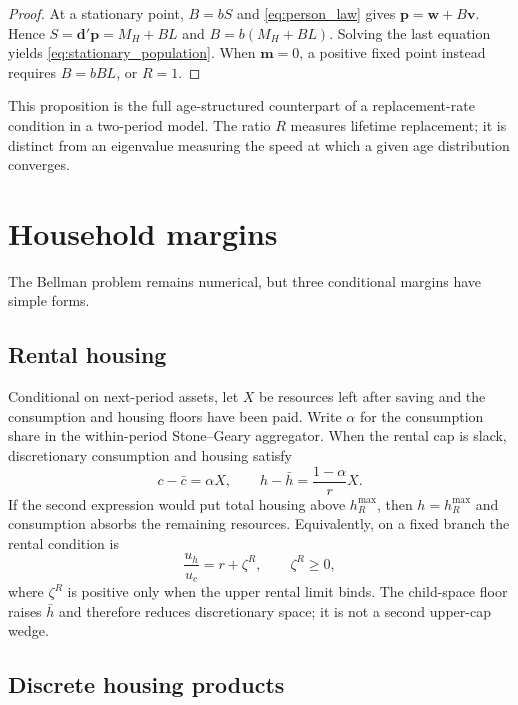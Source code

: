 \documentclass[11pt]{article}
\begin{document}
\begin{proof}
At a stationary point, $B=bS$ and \eqref{eq:person_law} gives
$\mathbf p=\mathbf w+B\mathbf v$.  Hence
$S=\mathbf d'\mathbf p=M_H+BL$ and
$B=b(M_H+BL)$.  Solving the last equation yields
\eqref{eq:stationary_population}.  When $\mathbf m=0$, a positive fixed point
instead requires $B=bBL$, or $R=1$.
\end{proof}

This proposition is the full age-structured counterpart of a replacement-rate
condition in a two-period model.  The ratio $R$ measures lifetime replacement;
it is distinct from an eigenvalue measuring the speed at which a given age
distribution converges.

\section{Household margins}

The Bellman problem remains numerical, but three conditional margins have
simple forms.

\subsection{Rental housing}

Conditional on next-period assets, let $X$ be resources left after saving and
the consumption and housing floors have been paid.  Write $\alpha$ for the
consumption share in the within-period Stone--Geary aggregator.  When the
rental cap is slack, discretionary consumption and housing satisfy
\begin{equation}
 c-\bar c=\alpha X,
 \qquad
 h-\bar h=\frac{1-\alpha}{r}X.
 \label{eq:renter_solution}
\end{equation}
If the second expression would put total housing above $h_R^{\max}$, then
$h=h_R^{\max}$ and consumption absorbs the remaining resources.  Equivalently,
on a fixed branch the rental condition is
\begin{equation}
 \frac{u_h}{u_c}=r+\zeta^R,
 \qquad
 \zeta^R\geq0,
 \label{eq:rental_wedge}
\end{equation}
where $\zeta^R$ is positive only when the upper rental limit binds.  The
child-space floor raises $\bar h$ and therefore reduces discretionary space; it
is not a second upper-cap wedge.

\subsection{Discrete housing products}
\end{document}

